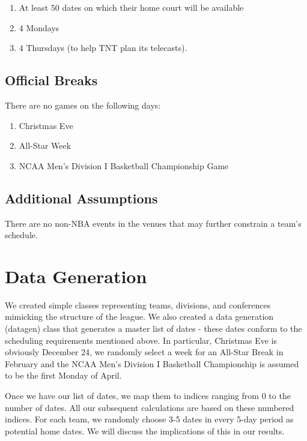 \documentclass{article}
\begin{document}
	\begin{enumerate}
		\item At least 50 dates on which their home court will be available
		\item 4 Mondays
		\item 4 Thursdays (to help TNT plan its telecasts).
	\end{enumerate}

	\subsection{Official Breaks}

	There are no games on the following days:

	\begin{enumerate}
		\item Christmas Eve
		\item All-Star Week
		\item NCAA Men's Division I Basketball Championship Game
	\end{enumerate}

    \subsection{Additional Assumptions}
    
    There are no non-NBA events in the venues that may further constrain a team's schedule.
	
	\section{Data Generation}

	We created simple classes representing teams, divisions, and conferences mimicking the structure of the league. We also created a data generation (datagen) class that generates a master list of dates - these dates conform to the scheduling requirements mentioned above. In particular, Christmas Eve is obviously December 24, we randomly select a week for an All-Star Break in February and the NCAA Men's Division I Basketball Championship is assumed to be the first Monday of April.

	Once we have our list of dates, we map them to indices ranging from 0 to the number of dates. All our subsequent calculations are based on these numbered indices. For each team, we randomly choose 3-5 dates in every 5-day period as potential home dates. We will discuss the implications of this in our results.
	
\end{document}

